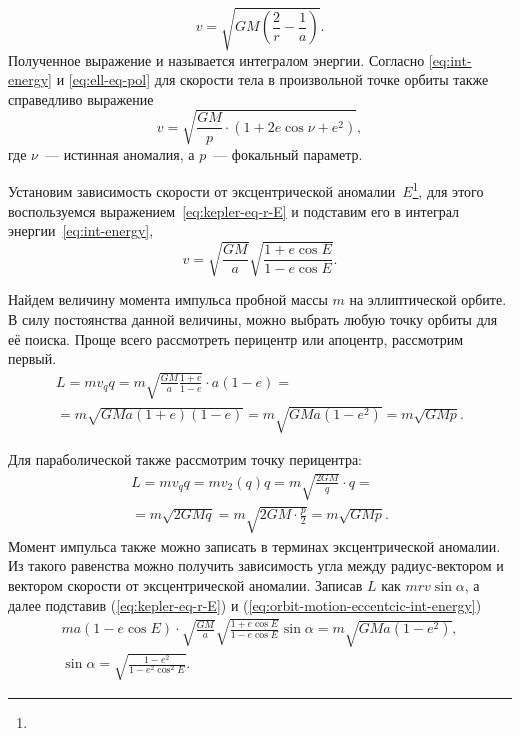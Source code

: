 \begin{equation}
    v = \sqrt{ GM \left( \frac{2}{r} - \frac{1}{a} \right)}.
    \label{eq:int-energy}
\end{equation}
Полученное выражение и называется интегралом энергии. Согласно \eqref{eq:int-energy} и \eqref{eq:ell-eq-pol} для скорости тела в произвольной точке орбиты также справедливо выражение
\begin{equation}
    v = \sqrt{\frac{GM}{p}\cdot(1 + 2 e \cos \nu + e^2)},
\end{equation}
где $\nu$~--- истинная аномалия, а $p$~--- фокальный параметр.

Установим зависимость скорости от эксцентрической аномалии~$E$\footnote{}, для этого воспользуемся выражением~\eqref{eq:kepler-eq-r-E} и подставим его в интеграл энергии~\eqref{eq:int-energy}, 
\begin{equation}
	v = \sqrt{\frac{GM}{a}}\sqrt{\frac{1 + e \cos E}{1 - e \cos E}}.
	\label{eq:orbit-motion-eccentcic-int-energy}
\end{equation}

Найдем величину момента импульса пробной массы $m$ на эллиптической орбите. В силу постоянства данной величины, можно выбрать любую точку орбиты для её поиска. Проще всего рассмотреть перицентр или апоцентр, рассмотрим первый.
\begin{multline*}
    L
    = m v_q q
    = m \sqrt{\frac{GM}{a} \frac{1+e}{1-e}} \cdot a(1-e) =\\
    = m \sqrt{GMa (1 + e)(1-e)}
    = m \sqrt{GMa(1-e^2)}
    = m \sqrt{GMp}.
\end{multline*}

Для параболической также рассмотрим точку перицентра:
\begin{multline*}
    L
    = m v_q q
    = m v_2(q) q
    = m \sqrt{\frac{2GM}{q}} \cdot q =\\
    = m \sqrt{2GMq}
    = m \sqrt{2GM \cdot \frac{p}{2}}
    = m \sqrt{GMp}.
\end{multline*}
Момент импульса также можно записать в терминах эксцентрической аномалии. Из такого равенства можно получить зависимость угла между радиус-вектором и вектором скорости от эксцентрической аномалии. Записав $L$ как $m r v \sin \alpha$, а далее подставив (\ref{eq:kepler-eq-r-E}) и (\ref{eq:orbit-motion-eccentcic-int-energy})
\begin{gather}
	m a (1 - e \cos E) \cdot \sqrt{\frac{GM}{a}}\sqrt{\frac{1 + e \cos E}{1 - e \cos E}} \sin \alpha = m \sqrt{GMa(1-e^2)}, \nonumber\\
	 \sin \alpha = \sqrt{\frac{1-e^2}{1- e^2 \cos^2 E}}.
\end{gather}


